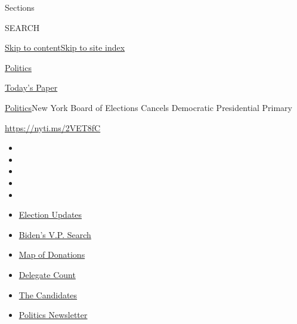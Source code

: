 Sections

SEARCH

\protect\hyperlink{site-content}{Skip to
content}\protect\hyperlink{site-index}{Skip to site index}

\href{https://www.nytimes.com/section/politics}{Politics}

\href{https://myaccount.nytimes.com/auth/login?response_type=cookie\&client_id=vi}{}

\href{https://www.nytimes.com/section/todayspaper}{Today's Paper}

\href{/section/politics}{Politics}\textbar{}New York Board of Elections
Cancels Democratic Presidential Primary

\url{https://nyti.ms/2VET8fC}

\begin{itemize}
\item
\item
\item
\item
\item
\end{itemize}

\begin{itemize}
\item
  \href{https://www.nytimes.com/2020/08/03/us/elections/biden-vs-trump.html?action=click\&pgtype=Article\&state=default\&region=TOP_BANNER\&context=storylines_menu}{Election
  Updates}
\item
  \href{https://www.nytimes.com/article/biden-vice-president-2020.html?action=click\&pgtype=Article\&state=default\&region=TOP_BANNER\&context=storylines_menu}{Biden's
  V.P. Search}
\item
  \href{https://www.nytimes.com/interactive/2020/07/24/us/politics/trump-biden-campaign-donors.html?action=click\&pgtype=Article\&state=default\&region=TOP_BANNER\&context=storylines_menu}{Map
  of Donations}
\item
  \href{https://www.nytimes.com/interactive/2020/us/elections/delegate-count-primary-results.html?action=click\&pgtype=Article\&state=default\&region=TOP_BANNER\&context=storylines_menu}{Delegate
  Count}
\item
  \href{https://www.nytimes.com/interactive/2019/us/politics/2020-presidential-candidates.html?action=click\&pgtype=Article\&state=default\&region=TOP_BANNER\&context=storylines_menu}{The
  Candidates}
\item
  \href{https://www.nytimes.com/newsletters/politics?action=click\&pgtype=Article\&state=default\&region=TOP_BANNER\&context=storylines_menu}{Politics
  Newsletter}
\end{itemize}

